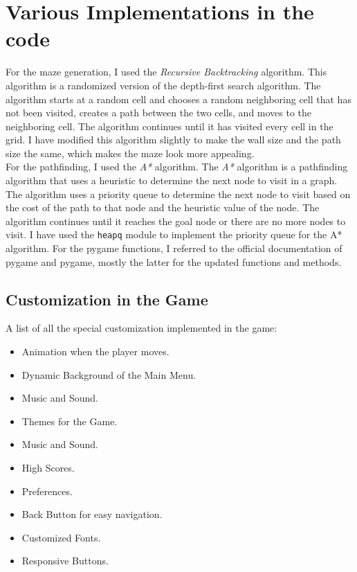 \documentclass[10pt]{article}
\begin{document}
    \section{Various Implementations in the code}\label{sec:my-project-journey-and-various-implementations-in-the-code}
    For the maze generation, I used the \emph{Recursive Backtracking} algorithm.
    This algorithm is a randomized version of the depth-first search algorithm.
    The algorithm starts at a random cell and chooses a random neighboring cell that has not been visited, creates a path between the two cells, and moves to the neighboring cell.
    The algorithm continues until it has visited every cell in the grid.
    I have modified this algorithm slightly to make the wall size and the path size the same, which makes the maze look more appealing.
    \cite{MazeGeneration}\\
    For the pathfinding, I used the \emph{A*} algorithm.
    The \emph{A*} algorithm is a pathfinding algorithm that uses a heuristic to determine the next node to visit in a graph.
    The algorithm uses a priority queue to determine the next node to visit based on the cost of the path to that node and the heuristic value of the node.
    The algorithm continues until it reaches the goal node or there are no more nodes to visit.
    I have used the \texttt{heapq} module to implement the priority queue for the A* algorithm.
    \cite{MazeSolver}
    For the pygame functions, I referred to the official documentation of pygame\cite{pygameDoc} and pygame\cite{pygameCEDoc}, mostly the latter for the updated functions and methods.\\

    \subsection{Customization in the Game}\label{subsec:customisations-in-the-game}
    A list of all the special customization implemented in the game:
    \begin{itemize}
        \item Animation when the player moves.
        \item Dynamic Background of the Main Menu.
        \item Music and Sound.
        \item Themes for the Game.
        \item Music and Sound.
        \item High Scores.
        \item Preferences.
        \item Back Button for easy navigation.
        \item Customized Fonts.
        \item Responsive Buttons.
    \end{itemize}
\end{document}
